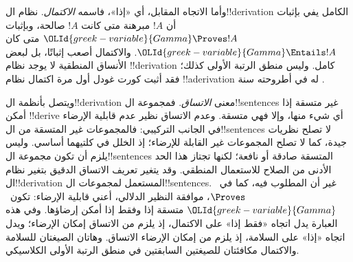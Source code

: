 \documentclass[../../../include/open-logic-section]{subfiles}
\begin{document}
وأما الاتجاه المقابل، أي «إذا»، فاسمه \emph{الاكتمال}. نظام ال!!{derivation} الكامل يفي بإثبات أن $!A$ مبرهنة متى كانت $!A$ صالحة، وبإثبات
$\OLId{greek-variable}{Gamma} \Proves !A$ متى كان $\OLId{greek-variable}{Gamma} \Entails !A$.
والاكتمال أصعب إثباتًا، بل لبعض الأنساق المنطقية لا يوجد نظام
!!{derivation} كامل. وليس منطق الرتبة الأولى كذلك؛ فقد أثبت كورت غودل أول مرة اكتمال نظام
!!a{derivation} له في أطروحته سنة .

ويتصل بأنظمة ال!!{derivation} معنى \emph{الاتساق}. فمجموعة ال!!{sentence}s غير متسقة إذا أمكن
!!{derive} أي شيء منها، وإلا فهي متسقة. وعدم الاتساق نظير عدم قابلية الإرضاء في الجانب التركيبي: فالمجموعات غير المتسقة من ال!!{sentence}s لا تصلح نظريات جيدة، كما لا تصلح المجموعات غير القابلة للإرضاء؛ إذ الخلل في كلتيهما أساسي. وليس يلزم أن تكون مجموعة ال!!{sentence}s المتسقة صادقة أو نافعة؛ لكنها تجتاز هذا الحد الأدنى من الصلاح للاستعمال المنطقي.
وقد يتغير تعريف الاتساق الدقيق بتغير نظام ال!!{derivation} المستعمل لمجموعات ال!!{sentence}s. غير أن المطلوب فيه، كما في~$\Proves$، موافقة النظير الدلالي، أعني قابلية الإرضاء: تكون~$\OLId{greek-variable}{Gamma}$ متسقة إذا وفقط إذا أمكن إرضاؤها. وفي هذه العبارة يدل اتجاه «فقط إذا» على الاكتمال، إذ يلزم من الاتساق إمكان الإرضاء؛ ويدل اتجاه «إذا» على السلامة، إذ يلزم من إمكان الإرضاء الاتساق. وهاتان الصيغتان للسلامة والاكتمال مكافئتان للصيغتين السابقتين في منطق الرتبة الأولى الكلاسيكي.
\end{document}
